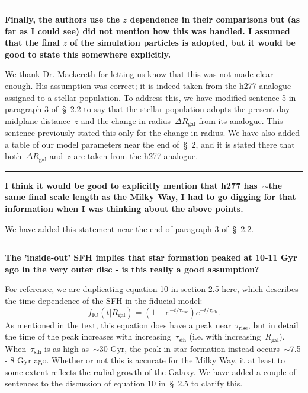 \documentclass{report}
\newcommand{\breakline}{\noindent\rule{\textwidth}{1pt}}
\begin{document}
\par\null\par 
\breakline 
\par\null\par 
\textbf{
	Finally, the authors use the $z$ dependence in their comparisons but (as 
	far as I could see) did not mention how this was handled. 
	I assumed that the final $z$ of the simulation particles is adopted, but it 
	would be good to state this somewhere explicitly. 
} 
\par 
We thank Dr. Mackereth for letting us know that this was not made clear enough. 
His assumption was correct; it is indeed taken from the h277 analogue assigned 
to a stellar population. 
To address this, we have modified sentence 5 in paragraph 3 of~\S~2.2 to say 
that the stellar population adopts the present-day midplane distance~$z$ and 
the change in radius~$\Delta R_\text{gal}$ from its analogue. 
This sentence previously stated this only for the change in radius. 
We have also added a table of our model parameters near the end of~\S~2, and 
it is stated there that both~$\Delta R_\text{gal}$ and~$z$ are taken from 
the h277 analogue. 

\par\null\par 
\breakline 
\par\null\par 
\textbf{
	I think it would be good to explicitly mention that h277 has~$\sim$the same 
	final scale length as the Milky Way, I had to go digging for that 
	information when I was thinking about the above points.
} 
\par 
We have added this statement near the end of paragraph 3 of~\S~2.2. 

\par\null\par 
\breakline 
\par\null\par 
\textbf{
	The 'inside-out' SFH implies that star formation peaked at 10-11 Gyr ago in 
	the very outer disc - is this really a good assumption? 
}
\par 
For reference, we are duplicating equation 10 in section 2.5 here, which 
describes the time-dependence of the SFH in the fiducial model: 
\begin{equation} 
f_\text{IO}(t|R_\text{gal}) = (1 - e^{-t/\tau_\text{rise}})
e^{-t/\tau_\text{sfh}}. 
\end{equation} 
As mentioned in the text, this equation does have a peak 
near~$\tau_\text{rise}$, but in detail the time of the peak increases with 
increasing~$\tau_\text{sfh}$ (i.e. with increasing~$R_\text{gal}$). 
When~$\tau_\text{sfh}$ is as high as~$\sim$30 Gyr, the peak in star formation 
instead occurs~$\sim$7.5 - 8 Gyr ago. 
Whether or not this is accurate for the Milky Way, it at least to some extent 
reflects the radial growth of the Galaxy. 
We have added a couple of sentences to the discussion of equation 10 in~\S~2.5 
to clarify this. 
\end{document}
